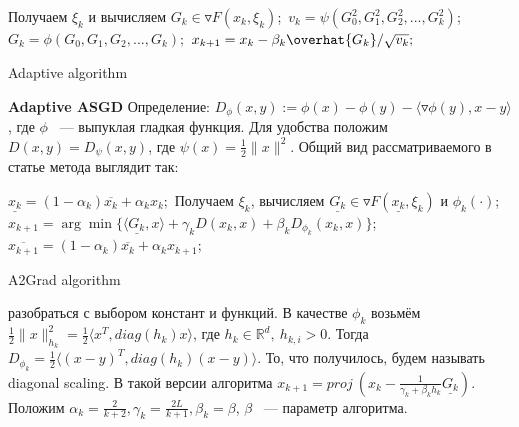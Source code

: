 \documentclass[oneside,final,12pt]{article}
\begin{document}
\begin{algorithm}[H]
\SetAlgoLined
{}
 {
    Получаем $\xi_k$ и вычисляем $G_k \in \triangledown F(x_k, \xi_k)$;\
    $v_k = \psi(G_0^2, G_1^2, G_2^2, ...,G_k^2)$;\newline
    $G_k = \phi(G_0, G_1, G_2, ..., G_k);$\newline
    $x_{k+1} = x_k - \beta_k\overhat{G_k}/\sqrt{v_k};$
}
 \caption{Adaptive algorithm}
\end{algorithm}
\newline
\break\noindent\textbf{\Large{Adaptive ASGD}}\newline\break
Определение: $D_\phi(x, y) := \phi(x) - \phi(y) - \langle \triangledown \phi(y), x - y\rangle$, где $\phi$ ~--- выпуклая гладкая функция.\newline
Для удобства положим $D(x, y) = D_\psi(x, y)$, где $\psi(x) = \frac{1}{2}\|x\|^2.$\newline\newline
Общий вид рассматриваемого в статье метода выглядит так:\newline
\begin{algorithm}[H]
\SetAlgoLined
{}
 {
    $\underline{x_k} = (1 - \alpha_k)\overline{x_k} + \alpha_k x_k;$\newline
    Получаем $\xi_k$, вычисляем $\underline{G_k}\in\triangledown F(\underline{x_k}, \xi_k)$ и $\phi_k(\cdot)$;\newline
    $x_{k+1} = \arg \min \{\langle \underline{G_k}, x\rangle + \gamma_k D(x_k, x) + \beta_k D_{\phi_k}(x_k, x)\}$;\newline
    $\overline{x_{k+1}} = (1 - \alpha_k)\overline{x_k} + \alpha_k x_{k+1}$;
}
 \caption{A2Grad algorithm}
\end{algorithm}\newline
{} разобраться с выбором констант и функций.\newline
В качестве $\phi_k$ возьмём $\frac{1}{2}\|x\|^2_{h_k} = \frac{1}{2}\langle x^T, diag(h_k)x\rangle$, где $h_k \in \mathbb{R}^d,\ h_{k, i} > 0$. Тогда $D_{\phi_k} = \frac{1}{2}\langle (x - y)^T, diag(h_k)(x - y)\rangle$. То, что получилось, будем называть diagonal scaling. В такой версии алгоритма $x_{k+1} = proj\ (x_k - \frac{1}{\gamma_k + \beta_k h_k}\underline{G_k})$.\newline
Положим $\alpha_k = \frac{2}{k + 2}, \gamma_k = \frac{2L}{k + 1}, \beta_k = \beta$, $\beta$ ~--- параметр алгоритма.\newline
\end{document}
